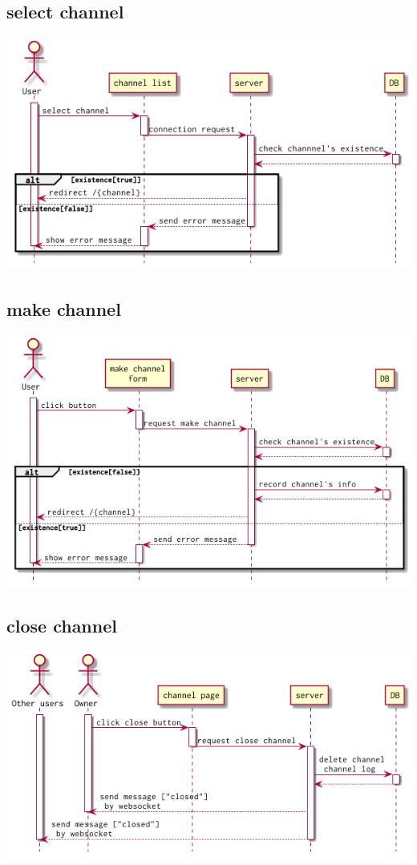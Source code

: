 \documentclass{scrartcl}
\begin{document}
\subsection{select channel}
\label{sec:org89767ef}
\begin{center}
\includegraphics[width=.9\linewidth]{selct-channel-seq.png}
\end{center}
\subsection{make channel}
\label{sec:orgdc3163f}
\begin{center}
\includegraphics[width=.9\linewidth]{make-channel-seq.png}
\end{center}
\subsection{close channel}
\label{sec:org83ad3ef}
\begin{center}
\includegraphics[width=.9\linewidth]{close-channel-seq.png}
\end{center}
\end{document}
